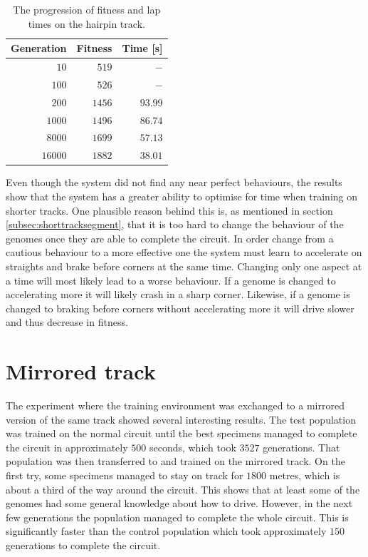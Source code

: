 \begin{table}[H] 
  \centering
  \begin{tabular}{|r|r|r|}
    \toprule
    Generation & Fitness & Time [s]\\
    \midrule
    $10$    & $519$     & $-$       \\
    $100$   & $526$     & $-$       \\
    $200$   & $1456$    & $93.99$   \\
    $1000$  & $1496$    & $86.74$   \\
    $8000$  & $1699$    & $57.13$   \\
    $16000$ & $1882$    & $38.01$   \\
    \bottomrule
  \end{tabular}
  \caption{The progression of fitness and lap times on the hairpin track.}
  \label{tab:180deg}
\end{table}



\noindent
Even though the system did not find any near perfect behaviours, the results show that the system has a greater ability to optimise for time when training on shorter tracks. One plausible reason behind this is, as mentioned in section \ref{subsec:shorttracksegment}, that it is too hard to change the behaviour of the genomes once they are able to complete the circuit. In order change from a cautious behaviour to a more effective one the system must learn to accelerate on straights and brake before corners at the same time. Changing only one aspect at a time will most likely lead to a worse behaviour. If a genome is changed to accelerating more it will likely crash in a sharp corner. Likewise, if a genome is changed to braking before corners without accelerating more it will drive slower and thus decrease in fitness.  




\section{Mirrored track}
\label{result:mirror}
The experiment where the training environment was exchanged to a mirrored version of the same track showed several interesting results. The test population was trained on the normal circuit until the best specimens managed to complete the circuit in approximately $500$ seconds, which took $3527$ generations. That population was then transferred to and trained on the mirrored track. On the first try, some specimens managed to stay on track for $1800$ metres, which is about a third of the way around the circuit. This shows that at least some of the genomes had some general knowledge about how to drive. However, in the next few generations the population managed to complete the whole circuit. This is significantly faster than the control population which took approximately $150$ generations to complete the circuit. 

